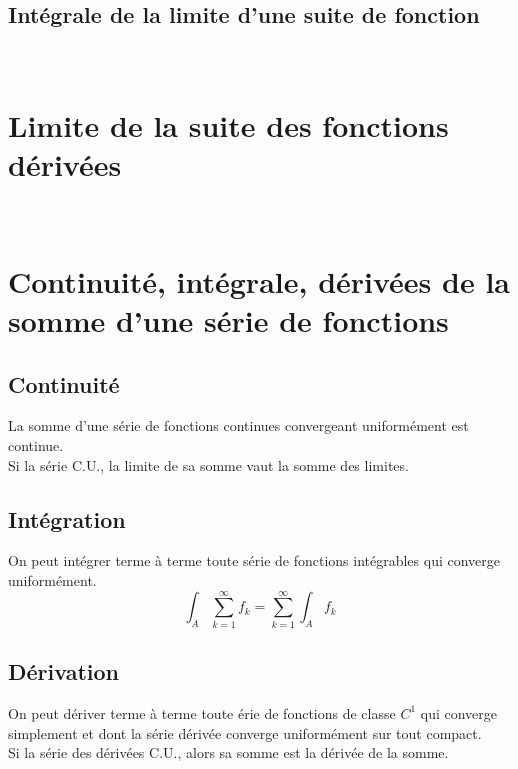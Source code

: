 \documentclass[british,french,11pt, a4paper, openany]{book}
\newcommand{\serie}{\sum_{k=1}^\infty}
\begin{document}
		\subsection{Intégrale de la limite d'une suite de fonction}
		\ 
							
							
		\section{Limite de la suite des fonctions dérivées}
		\ 
							
		\setcounter{section}{6}
		\section{Continuité, intégrale, dérivées de la somme d'une série de fonctions}
		\subsection{Continuité}
		La somme d'une série de fonctions continues convergeant uniformément est continue.\\
		Si la série C.U., la limite de sa somme vaut la somme des limites.
		\subsection{Intégration}
		On peut intégrer terme à terme toute série de fonctions intégrables qui converge uniformément.
		\begin{equation}
			\int_A \serie f_k = \serie \int_A f_k
		\end{equation}
							
		\subsection{Dérivation}
		On peut dériver terme à terme toute érie de fonctions de classe $C^1$ qui converge simplement et dont la série dérivée converge uniformément sur tout compact.\\
		Si la série des dérivées C.U., alors sa somme est la dérivée de la somme.
							
\end{document}
